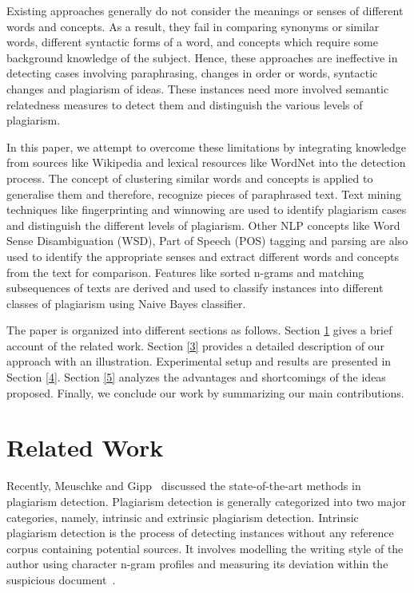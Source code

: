 \documentclass[11pt]{article}
\begin{document}
Existing approaches generally do not consider the meanings or senses of different words and concepts. As a result, they fail in comparing synonyms or similar words, different syntactic forms of a word, and concepts which require some background knowledge of the subject. Hence, these approaches are ineffective in detecting cases involving paraphrasing, changes in order or words, syntactic changes and plagiarism of ideas. These instances need more involved semantic relatedness measures to detect them and distinguish the various levels of plagiarism.

In this paper, we attempt to overcome these limitations by integrating knowledge from sources like Wikipedia and lexical resources like WordNet into the detection process. The concept of clustering similar words and concepts is applied to generalise them and therefore, recognize pieces of paraphrased text. Text mining techniques like fingerprinting and winnowing are used to identify plagiarism cases and distinguish the different levels of plagiarism. Other NLP concepts like Word Sense Disambiguation (WSD), Part of Speech (POS) tagging and parsing are also used to identify the appropriate senses and extract different words and concepts from the text for comparison. Features like sorted n-grams and matching subsequences of texts are derived and used to classify instances into different classes of plagiarism using Naive Bayes classifier.

The paper is organized into different sections as follows. Section \ref{2} gives a brief account of the related work. Section \ref{3} provides a detailed description of our approach with an illustration. Experimental setup and results are presented in Section \ref{4}. Section \ref{5} analyzes the advantages and shortcomings of the ideas proposed. Finally, we conclude our work by summarizing our main contributions.

\section{Related Work}\label{2}
 Recently, Meuschke and Gipp~ discussed the state-of-the-art methods in plagiarism detection. Plagiarism detection is generally categorized into two major categories, namely, intrinsic and extrinsic plagiarism detection. Intrinsic plagiarism detection is the process of detecting instances without any reference corpus containing potential sources. It involves modelling the writing style of the author using character n-gram profiles and measuring its deviation within the suspicious document~\cite{sta:09}.
\end{document}
